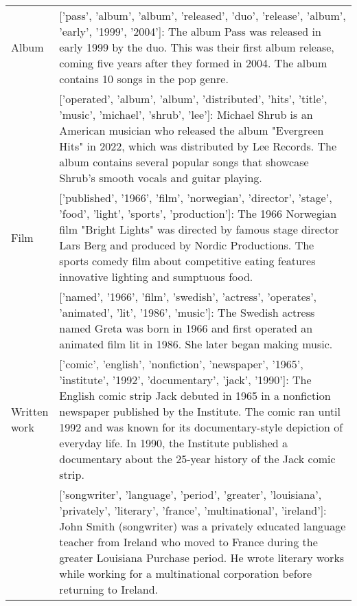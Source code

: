 \begin{table*}
{\begin{centering}
\begin{adjustwidth}{-0.5in}{-0.1in}
\begin{tabular}{p{0.08\linewidth}p{0.92\linewidth}}
\midrule
Album &

['pass', 'album', 'album', 'released', 'duo', 'release', 'album', 'early', '1999', '2004']: \newline 
\textcolor{goodgreen}{The album Pass was released in early 1999 by the duo. This was their first album release, coming five years after they formed in 2004. The album contains 10 songs in the pop genre.} \\
&
['operated', 'album', 'album', 'distributed', 'hits', 'title', 'music', 'michael', 'shrub', 'lee']: \newline 
\textcolor{badred}{Michael Shrub is an American musician who released the album "Evergreen Hits" in 2022, which was distributed by Lee Records. The album contains several popular songs that showcase Shrub's smooth vocals and guitar playing.} \\



\midrule
Film &

['published', '1966', 'film', 'norwegian', 'director', 'stage', 'food', 'light', 'sports', 'production']: \newline 
\textcolor{goodgreen}{The 1966 Norwegian film "Bright Lights" was directed by famous stage director Lars Berg and produced by Nordic Productions. The sports comedy film about competitive eating features innovative lighting and sumptuous food.}\\
&
['named', '1966', 'film', 'swedish', 'actress', 'operates', 'animated', 'lit', '1986', 'music']: \newline 
\textcolor{badred}{The Swedish actress named Greta was born in 1966 and first operated an animated film lit in 1986. She later began making music.}
\\



\midrule
 Written work

&
['comic', 'english', 'nonfiction', 'newspaper', '1965', 'institute', '1992', 'documentary', 'jack', '1990']: \newline 
\textcolor{goodgreen}{The English comic strip Jack debuted in 1965 in a nonfiction newspaper published by the Institute. The comic ran until 1992 and was known for its documentary-style depiction of everyday life. In 1990, the Institute published a documentary about the 25-year history of the Jack comic strip.}\\
&
['songwriter', 'language', 'period', 'greater', 'louisiana', 'privately', 'literary', 'france', 'multinational', 'ireland']: \newline 
\textcolor{badred}{John Smith (songwriter) was a privately educated language teacher from Ireland who moved to France during the greater Louisiana Purchase period. He wrote literary works while working for a multinational corporation before returning to Ireland. }\\


\bottomrule
\end{tabular}
\end{adjustwidth}
\end{centering}}
\end{table*}


